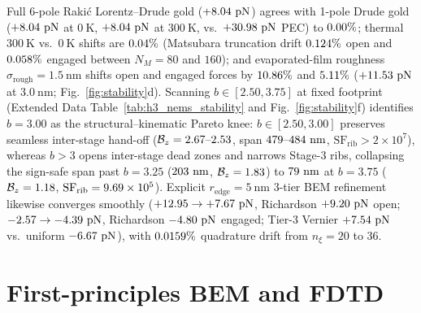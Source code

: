 \documentclass[pdflatex,sn-nature]{sn-jnl}
\begin{document}
Full 6-pole Raki\'c Lorentz--Drude gold\cite{rakic1998} ($+8.04{}\ \mathrm{pN}$) agrees with 1-pole Drude gold ($+8.04{}\ \mathrm{pN}$ at $0\ \mathrm{K}$, $+8.04{}\ \mathrm{pN}$ at $300\ \mathrm{K}$, vs.\ $+30.98{}\ \mathrm{pN}$ PEC) to $0.00{}\%$; thermal $300\ \mathrm{K}$ vs.\ $0\ \mathrm{K}$ shifts are $0.04{}\%$ (Matsubara truncation drift $0.124{}\%$ open and $0.058{}\%$ engaged between $N_M = 80$ and $160$); and evaporated-film roughness $\sigma_{\mathrm{rough}} = 1.5\ \mathrm{nm}$ shifts open and engaged forces by $10.86{}\%$ and $5.11{}\%$ ($+11.53{}\ \mathrm{pN}$ at $3.0\ \mathrm{nm}$; Fig.~\ref{fig:stability}d). Scanning $b \in [2.50, 3.75]$ at fixed footprint (Extended Data Table~\ref{tab:h3_nems_stability} and Fig.~\ref{fig:stability}f) identifies $b = 3.00$ as the structural--kinematic Pareto knee: $b \in [2.50, 3.00]$ preserves seamless inter-stage hand-off ($\mathcal{B}_z = 2.67{}\text{--}2.53{}$, span $479{}\text{--}484{}\ \mathrm{nm}$, $\mathrm{SF}_{\mathrm{rib}} > 2\times 10^7$), whereas $b > 3$ opens inter-stage dead zones and narrows Stage-3 ribs, collapsing the sign-safe span past $b = 3.25$ ($203{}\ \mathrm{nm}$, $\mathcal{B}_z = 1.83{}$) to $79{}\ \mathrm{nm}$ at $b = 3.75$ ($\mathcal{B}_z = 1.18{}$, $\mathrm{SF}_{\mathrm{rib}} = 9.69\times 10^{5}{}$). Explicit $r_{\mathrm{edge}} = 5\ \mathrm{nm}$ 3-tier BEM refinement likewise converges smoothly ($+12.95{} \to +7.67{}\ \mathrm{pN}$, Richardson $+9.20{}\ \mathrm{pN}$ open; $-2.57{} \to -4.39{}\ \mathrm{pN}$, Richardson $-4.80{}\ \mathrm{pN}$ engaged; Tier-3 Vernier $+7.54{}\ \mathrm{pN}$ vs.\ uniform $-6.67{}\ \mathrm{pN}$), with $0.0159{}\%$ quadrature drift from $n_\xi = 20$ to $36$.

\section*{First-principles BEM and FDTD}
\label{sec:convergence}
\end{document}
